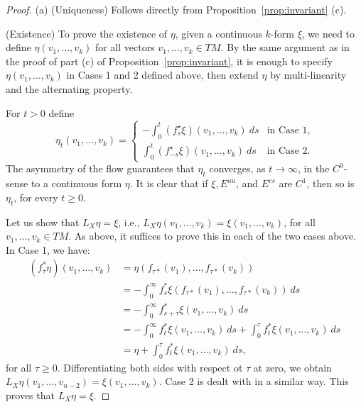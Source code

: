 \documentclass[11pt,letterpaper,reqno,abstract=true]{scrartcl}
\theoremstyle{plain}                              %
\theoremstyle{definition}                         %
\theoremstyle{remark}                             %
\begin{document}
\begin{proof}
  (a) (\textsf{Uniqueness}) Follows directly from Proposition~\ref{prop:invariant}
  (c).

  \medskip
   
  \noindent (\textsf{Existence}) To prove the existence of $\eta$,
  given a continuous $k$-form $\xi$, we need to define
  $\eta(v_1,\ldots,v_k)$ for all vectors $v_1, \ldots,v_k \in TM$. By
  the same argument as in the proof of part (c) of Proposition~\ref{prop:invariant},
  it is enough to specify $\eta(v_1,\ldots,v_k)$ in Cases 1 and 2
  defined above, then extend $\eta$ by multi-linearity and the
  alternating property.

    For $t > 0$ define
%
    \begin{displaymath}
    \eta_t(v_1,\ldots,v_k) =
    \begin{cases}
      - {\displaystyle \int_0^t (f_s^\star \xi) (v_1,\ldots,v_k)
        \: ds} & \text{in Case 1,} \\
      {\displaystyle \int_0^t (f_{-s}^\star \xi) (v_1,\ldots,v_k)
        \: ds} & \text{in Case 2}.
    \end{cases}
  \end{displaymath}
%
  The asymmetry of the flow guarantees that $\eta_t$ converges, as
  $t \to \infty$, in the $C^0$-sense to a continuous form $\eta$. It
  is clear that if $\xi, E^{uu}$, and $E^{cs}$ are $C^1$, then so is
  $\eta_t$, for every $t \geq 0$.
   
  Let us show that $L_X \eta = \xi$, i.e.,
  $L_X \eta(v_1,\ldots, v_k) = \xi(v_1,\ldots, v_k)$, for all
  $v_1, \ldots, v_k \in TM$. As above, it suffices to prove this
  in each of the two cases above. In Case 1, we have:
%
   \begin{align*}
     (f_{\tau}^\ast \eta)(v_1,\ldots,v_k) 
     & = \eta(f_{\tau \ast}(v_1),\ldots, f_{\tau \ast}(v_k)) \\
     & = - \int_0^\infty f_s^\ast \xi(f_{\tau \ast}(v_1),
       \ldots, f_{\tau \ast}(v_k)) \: ds \\
     & = - \int_0^\infty f_{s+\tau}^\ast \xi(v_1,\ldots,v_k) \:
       ds \\
     & = - \int_0^\infty f_t^\ast \xi(v_1,\ldots,v_k) \:
       ds + \int_0^{\tau} f_t^\ast \xi(v_1,\ldots,v_k) \: ds \\
     & = \eta + \int_0^{\tau} f_t^\ast \xi(v_1,\ldots,v_k) \: ds,
   \end{align*}
%
   for all $\tau \geq 0$. Differentiating both sides with respect ot
   $\tau$ at zero, we obtain
   $L_X \eta(v_1,\ldots,v_{n-2}) = \xi(v_1,\ldots,v_k)$. Case 2 is
   dealt with in a similar way. This proves that $L_X \eta = \xi$.


\end{proof}
\end{document}
